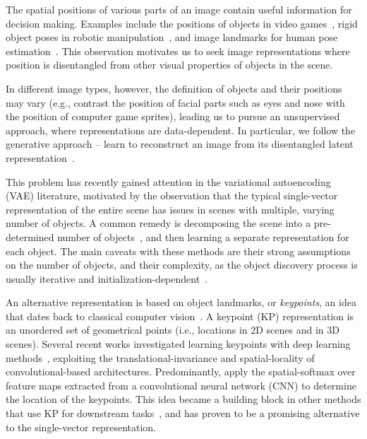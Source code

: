 \documentclass[nohyperref]{article}
\theoremstyle{plain}
\theoremstyle{definition}
\theoremstyle{remark}
\begin{document}
The spatial positions of various parts of an image contain useful information for decision making. Examples include the positions of objects in video games~\cite{smirnov2021marionette}, rigid object poses in robotic manipulation~\cite{byravan2017se3}, and image landmarks for human pose estimation~\cite{jakab2018unsupervised}. This observation motivates us to seek image representations where position is disentangled from other visual properties of objects in the scene.

In different image types, however, the definition of objects and their positions may vary (e.g., contrast the position of facial parts such as  eyes and nose with the position of computer game sprites), leading us to pursue an unsupervised approach, where representations are data-dependent. In particular, we follow the generative approach -- learn to reconstruct an image from its disentangled latent representation~\cite{burgess2019monet}.


This problem has recently gained attention in the variational autoencoding (VAE) literature, 
motivated by the observation that the typical single-vector representation of the entire scene has issues in scenes with multiple, varying number of objects. A common remedy is decomposing the scene into a pre-determined number of objects~\citep{burgess2019monet, watters2019cobra, kipf2019cswm}, and then learning a separate representation for each object. The main caveats with these methods are their strong assumptions on the number of objects, and their complexity, as the object discovery process is usually iterative and initialization-dependent~\citep{burgess2019monet, kipf2019cswm}.


An alternative representation is based on object landmarks, or \textit{keypoints}, an idea that dates back to classical computer vision~\citep{sift99}. A keypoint (KP) representation is an unordered set of geometrical points (i.e.,  locations in 2D scenes and  in 3D scenes). Several recent works investigated learning keypoints with deep learning methods~\citep{jakab2018unsupervised, thewlis2017unsupervised1, zhang2018kp, lorenz2019unsupervised, dundar2021unsupervised}, exploiting the translational-invariance and spatial-locality of convolutional-based architectures. Predominantly, \citet{jakab2018unsupervised} apply the  spatial-softmax over feature maps extracted from a convolutional neural network (CNN) to determine the location of the keypoints. This idea became a building block in other methods that use KP for downstream tasks~\citep{kulkarni2019transporter, gopalakrishnan2020permakey, boney2021keyq, he2021latentkeypointgan}, and has proven to be a promising alternative to the single-vector representation.
\end{document}
